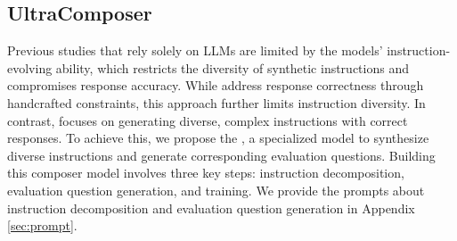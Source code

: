 \subsection{UltraComposer}
\label{sec:composer}

Previous studies \citep{xu2023wizardlm,sun2024conifer} that rely solely on LLMs are limited by the models' instruction-evolving ability, which restricts the diversity of synthetic instructions and compromises response accuracy. While \citet{wang-etal-2023-self-instruct,dong2024self} address response correctness through handcrafted constraints, this approach further limits instruction diversity.
In contrast, \method focuses on generating diverse, complex instructions with correct responses. To achieve this, we propose the \textit{\composer}, a specialized model to synthesize diverse instructions and generate corresponding evaluation questions. Building this composer model involves three key steps: instruction decomposition, evaluation question generation, and \composer training.
We provide the prompts about instruction decomposition and evaluation question generation in Appendix \ref{sec:prompt}.



